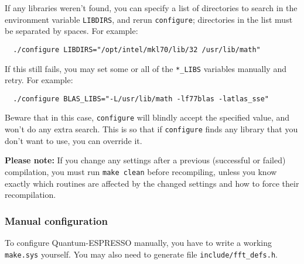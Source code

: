 \documentclass[12pt,a4paper]{article}
\begin{document}
If any libraries weren't found, you can specify a list of directories
to search in the environment variable \texttt{LIBDIRS}, and rerun
\texttt{configure}; directories in the list must be separated by
spaces.  For example:
\begin{verbatim}
  ./configure LIBDIRS="/opt/intel/mkl70/lib/32 /usr/lib/math"
\end{verbatim}
If this still fails, you may set some or all of the \texttt{*\_LIBS}
variables manually and retry.  For example:
\begin{verbatim}
  ./configure BLAS_LIBS="-L/usr/lib/math -lf77blas -latlas_sse"
\end{verbatim}
Beware that in this case, \texttt{configure} will blindly accept the
specified value, and won't do any extra search.  This is so that if
\texttt{configure} finds any library that you don't want to use, you
can override it.

\textbf{Please note:}
If you change any settings after a previous (successful or failed)
compilation, you must run \texttt{make clean} before recompiling,
unless you know exactly which routines are affected by the changed
settings and how to force their recompilation.

\subsubsection{Manual configuration}
  \label{manualconf}

To configure Quantum-ESPRESSO manually, you have to write a working
\texttt{make.sys} yourself. You may also need to generate file
\texttt{include/fft\_defs.h}.
\end{document}
